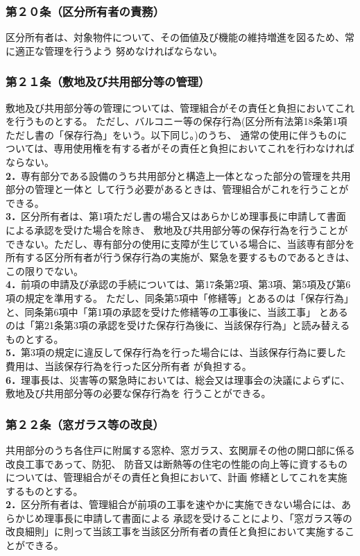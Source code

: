\documentclass[
  luatex,
  paper=a4paper,
  fontsize=11pt,
  jafontsize=10pt,
  jlreq_notes,
]{jlreq}
\begin{document}
  \subsubsection*{第２０条（区分所有者の責務）}
  区分所有者は、対象物件について、その価値及び機能の維持増進を図るため、常に適正な管理を行うよう
  努めなければならない。
  \subsubsection*{第２１条（敷地及び共用部分等の管理）}
  敷地及び共用部分等の管理については、管理組合がその責任と負担においてこれを行うものとする。
  ただし、バルコニー等の保存行為(区分所有法第18条第1項ただし書の「保存行為」をいう。以下同じ。)のうち、
  通常の使用に伴うものについては、専用使用権を有する者がその責任と負担においてこれを行わなければならない。\\
  \textbf{2．}専有部分である設備のうち共用部分と構造上一体となった部分の管理を共用部分の管理と一体と
  して行う必要があるときは、管理組合がこれを行うことができる。\\
  \textbf{3．}区分所有者は、第1項ただし書の場合又はあらかじめ理事長に申請して書面による承認を受けた場合を除き、
  敷地及び共用部分等の保存行為を行うことができない。ただし、専有部分の使用に支障が生じている場合に、当該専有部分を
  所有する区分所有者が行う保存行為の実施が、緊急を要するものであるときは、この限りでない。\\
  \textbf{4．}前項の申請及び承認の手続については、第17条第2項、第3項、第5項及び第6項の規定を準用する。
  ただし、同条第5項中「修繕等」とあるのは「保存行為」と、同条第6項中「第1項の承認を受けた修繕等の工事後に、当該工事」
  とあるのは「第21条第3項の承認を受けた保存行為後に、当該保存行為」と読み替えるものとする。\\
  \textbf{5．}第3項の規定に違反して保存行為を行った場合には、当該保存行為に要した費用は、当該保存行為を行った区分所有者
  が負担する。\\
  \textbf{6．}理事長は、災害等の緊急時においては、総会又は理事会の決議によらずに、敷地及び共用部分等の必要な保存行為を
  行うことができる。\\
  
  \subsubsection*{第２２条（窓ガラス等の改良）}
  共用部分のうち各住戸に附属する窓枠、窓ガラス、玄関扉その他の開口部に係る改良工事であって、防犯、
  防音又は断熱等の住宅の性能の向上等に資するものについては、管理組合がその責任と負担において、計画
  修繕としてこれを実施するものとする。\\
  \textbf{2．}区分所有者は、管理組合が前項の工事を速やかに実施できない場合には、あらかじめ理事長に申請して書面による
  承認を受けることにより、「窓ガラス等の改良細則」に則って当該工事を当該区分所有者の責任と負担において実施することができる。\\
          
\end{document}
